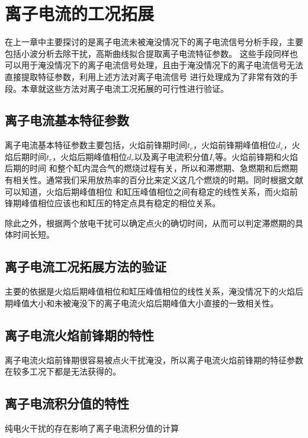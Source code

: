 \chapter{离子电流的工况拓展}
在上一章中主要探讨的是离子电流未被淹没情况下的离子电流信号分析手段，主要包括小波分析去除干扰，高斯曲线拟合提取离子电流特征参数。
这些手段同样也可以用于淹没情况下的离子电流信号处理，且由于淹没情况下的离子电流信号无法直接提取特征参数，利用上述方法对离子电流信号
进行处理成为了非常有效的手段。本章就这些方法对离子电流工况拓展的可行性进行验证。
\section{离子电流基本特征参数}
离子电流基本特征参数主要包括，火焰前锋期时间$t_c$，火焰前锋期峰值相位$d_c$，火焰后期时间$t_r$，火焰后期峰值相位$d_r$以及离子电流积分值$I_i$等。火焰前锋期和火焰后期的时间
和整个缸内混合气的燃烧过程有关，所以和滞燃期、急燃期和后燃期有相关性。通常我们采用放热率的百分比来定义这几个燃烧的时期。同时根据文献可以知道，火焰后期峰值相位
和缸压峰值相位之间有稳定的线性关系，而火焰前锋期峰值相位应该也和缸压的特定点具有稳定的相位关系。\par
除此之外，根据两个放电干扰可以确定点火的确切时间，从而可以判定滞燃期的具体时间长短。
\section{离子电流工况拓展方法的验证}
主要的依据是火焰后期峰值相位和缸压峰值相位的线性关系，淹没情况下的火焰后期峰值大小和未被淹没下的离子电流火焰后期峰值大小直接的一致相关性。
\section{离子电流火焰前锋期的特性}
离子电流火焰前锋期很容易被点火干扰淹没，所以离子电流火焰前锋期的特征参数在较多工况下都是无法获得的。
\section{离子电流积分值的特性}
纯电火干扰的存在影响了离子电流积分值的计算
